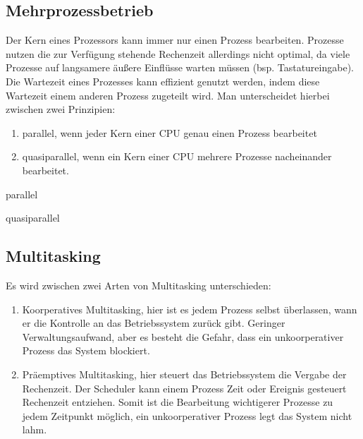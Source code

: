 \documentclass[12pt,a4paper]{article}
\begin{document}
\subsection{Mehrprozessbetrieb}
Der Kern eines Prozessors kann immer nur einen Prozess bearbeiten. Prozesse nutzen die zur Verfügung stehende Rechenzeit allerdings nicht optimal, da viele Prozesse auf langsamere äußere Einflüsse warten müssen (bsp. Tastatureingabe). Die Wartezeit eines Prozesses kann effizient genutzt werden, indem diese Wartezeit einem anderen Prozess zugeteilt wird. Man unterscheidet hierbei zwischen zwei Prinzipien:
\begin{enumerate}
	\item parallel, wenn jeder Kern einer CPU genau einen Prozess bearbeitet
	\item quasiparallel, wenn ein Kern einer CPU mehrere Prozesse nacheinander bearbeitet.
\end{enumerate}
\begin{minipage}{.45\textwidth}
	\centering
	\newline
	parallel
\end{minipage}
\hspace{1cm}
\begin{minipage}{.45\textwidth}
	\centering
	\newline
	quasiparallel
\end{minipage}

\subsection{Multitasking}
Es wird zwischen zwei Arten von Multitasking unterschieden:
\begin{enumerate}
	\item Koorperatives Multitasking, hier ist es jedem Prozess selbst überlassen, wann er die Kontrolle an das Betriebssystem zurück gibt. Geringer Verwaltungsaufwand, aber es besteht die Gefahr, dass ein unkoorperativer Prozess das System blockiert.
	\item Präemptives Multitasking, hier steuert das Betriebssystem die Vergabe der Rechenzeit. Der Scheduler kann einem Prozess Zeit oder Ereignis gesteuert Rechenzeit entziehen. Somit ist die Bearbeitung wichtigerer Prozesse zu jedem Zeitpunkt möglich, ein unkoorperativer Prozess legt das System nicht lahm. 
\end{enumerate}
\end{document}
